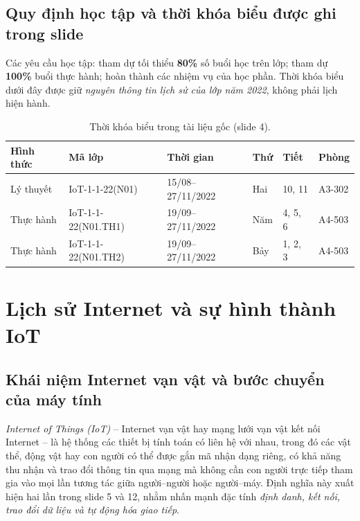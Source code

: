 \subsection{Quy định học tập và thời khóa biểu được ghi trong slide}
Các yêu cầu học tập: tham dự tối thiểu \textbf{80\%} số buổi học trên lớp; tham dự \textbf{100\%} buổi thực hành; hoàn thành các nhiệm vụ của học phần. Thời khóa biểu dưới đây được giữ \emph{nguyên thông tin lịch sử của lớp năm 2022}, không phải lịch hiện hành.
\begin{table}[H]\centering\small
\caption{Thời khóa biểu trong tài liệu gốc (slide 4).}
\begin{tabularx}{\linewidth}{@{}l l l l l X@{}}\toprule
Hình thức & Mã lớp & Thời gian & Thứ & Tiết & Phòng\\\midrule
Lý thuyết & IoT-1-1-22(N01) & 15/08--27/11/2022 & Hai & 10, 11 & A3-302\\
Thực hành & IoT-1-1-22(N01.TH1) & 19/09--27/11/2022 & Năm & 4, 5, 6 & A4-503\\
Thực hành & IoT-1-1-22(N01.TH2) & 19/09--27/11/2022 & Bảy & 1, 2, 3 & A4-503\\\bottomrule
\end{tabularx}\end{table}

\section{Lịch sử Internet và sự hình thành IoT}\label{sec:history}
\subsection{Khái niệm Internet vạn vật và bước chuyển của máy tính}
\emph{Internet of Things (IoT)} -- Internet vạn vật hay mạng lưới vạn vật kết nối Internet -- là hệ thống các thiết bị tính toán có liên hệ với nhau, trong đó các vật thể, động vật hay con người có thể được gắn mã nhận dạng riêng, có khả năng thu nhận và trao đổi thông tin qua mạng mà không cần con người trực tiếp tham gia vào mọi lần tương tác giữa người--người hoặc người--máy. Định nghĩa này xuất hiện hai lần trong slide 5 và 12, nhằm nhấn mạnh đặc tính \emph{định danh, kết nối, trao đổi dữ liệu và tự động hóa giao tiếp}. 

